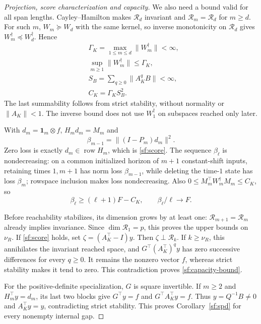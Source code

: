 \documentclass[journal]{IEEEtran}
\begin{document}
\begin{proof}[Projection, score characterization and capacity]
We also need a bound valid for all span lengths.
Cayley--Hamilton makes $\mathcal R_d$ invariant and
$\mathcal R_m=\mathcal R_d$ for $m\ge d$.
For such $m$, $W_m\succeq W_d$ with the same kernel, so inverse
monotonicity on $\mathcal R_d$ gives $W_m^\dagger\preceq W_d^\dagger$.
Hence
\begin{equation}\label{sf:gamma}
\begin{aligned}
&\Gamma_K=\max_{1\le m\le d}\|W_m^\dagger\|<\infty,\\
&\sup_{m\ge1}\|W_m^\dagger\|\le\Gamma_K,\\
&S_B=\sum_{q\ge0}\|A_K^qB\|<\infty,\\
&C_K=\Gamma_KS_B^2 .
\end{aligned}
\end{equation}
The last summability follows from strict stability, without normality
or $\|A_K\|<1$. The inverse bound does not use $W_1^\dagger$ on
subspaces reached only later.

With $d_m=\mathbf1_m\otimes f$, $H_md_m=M_m$ and
\[
\beta_{m-1}=\|(I-P_m)d_m\|^2.
\]
Zero loss is exactly $d_m\in\operatorname{row}H_m$, which is
\eqref{sf:score}.
The sequence $\beta_\ell$ is nondecreasing: on a common initialized
horizon of $m+1$ constant-shift inputs, retaining times $1,m+1$
has norm loss $\beta_{m-1}$, while deleting the time-$1$ state has
loss $\beta_m$; rowspace inclusion makes loss nondecreasing.
Also $0\le M_m^\top W_m^\dagger M_m\le C_K$, so
\begin{equation}\label{sf:tail}
\beta_\ell\ge(\ell+1)F-C_K,\qquad \beta_\ell/\ell\longrightarrow F.
\end{equation}

Before reachability stabilizes, its dimension grows by at least one:
$\mathcal R_{m+1}=\mathcal R_m$ already implies invariance.
Since $\dim\mathcal R_1=p$, this proves the upper bounds on $\nu_R$.
If \eqref{sf:score} holds, set $\zeta=(A_K^\top-I)y$.
Then $\zeta\perp\mathcal R_k$.
If $k\ge\nu_R$, this annihilates the invariant reached space, and
$G^\top(A_K^\top)^q y$ has zero successive differences for every
$q\ge0$. It remains the nonzero vector $f$, whereas strict stability
makes it tend to zero. This contradiction proves
\eqref{sf:capacity-bound}.

For the positive-definite specialization, $G$ is square invertible.
If $m\ge2$ and $H_m^\top y=d_m$, its last two blocks give
$G^\top y=f$ and $G^\top A_K^\top y=f$. Thus
$y=Q^{-1}B\ne0$ and $A_K^\top y=y$, contradicting strict stability.
This proves Corollary~\ref{sf:spd} for every nonempty internal gap.
\end{proof}
\end{document}
